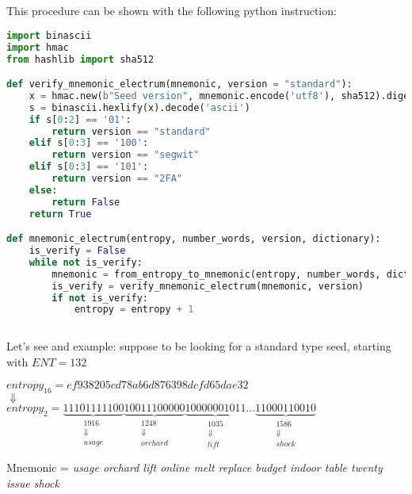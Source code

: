 \\ \\ 
This procedure can be shown with the following python instruction:
\begin{lstlisting}[language=Python]
import binascii
import hmac
from hashlib import sha512

def verify_mnemonic_electrum(mnemonic, version = "standard"):
	x = hmac.new(b"Seed version", mnemonic.encode('utf8'), sha512).digest()
	s = binascii.hexlify(x).decode('ascii')
	if s[0:2] == '01':
		return version == "standard"
	elif s[0:3] == '100':
		return version == "segwit"
	elif s[0:3] == '101':
		return version == "2FA"
	else:
		return False
	return True

def mnemonic_electrum(entropy, number_words, version, dictionary):	
	is_verify = False
	while not is_verify:
		mnemonic = from_entropy_to_mnemonic(entropy, number_words, dictionary)
		is_verify = verify_mnemonic_electrum(mnemonic, version)
		if not is_verify:
			entropy = entropy + 1
		
\end{lstlisting}

Let's see and example: suppose to be looking for a standard type seed, starting with $ENT=132$

\begin{center} 
	$ entropy_{16} = ef938205cd78ab6d876398dcfd65dae32 $ 
	\\
	$\Downarrow $
	\\
	$entropy_{2}= \underbrace{11101111100}_{\substack{1916 \\ \Downarrow\\ usage} }
	\underbrace{10011100000}_{\substack{1248 \\ \Downarrow\\ orchard}}
	\underbrace{10000001011}_{\substack{1035 \\ \Downarrow\\ lift}}
	...
	\underbrace{11000110010}_{\substack{1586 \\ \Downarrow\\ shock}}  $
\end{center}
Mnemonic = \textit{usage orchard lift online melt replace budget indoor table twenty issue shock}

